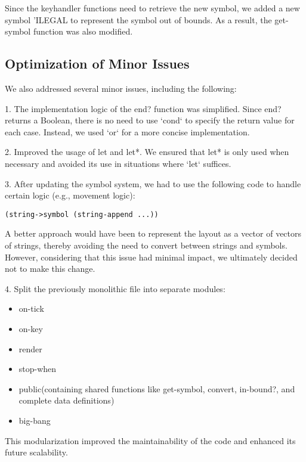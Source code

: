 \documentclass[12pt]{article}
\begin{document}
\indent Since the keyhandler functions need to retrieve the new symbol, we added a new symbol 'ILEGAL to represent the symbol out of bounds. As a result, the get-symbol function was also modified.

\subsection*{Optimization of Minor Issues}
\hspace*{1.27cm}We also addressed several minor issues, including the following:  

1. The implementation logic of the end? function was simplified. Since end? returns a Boolean, there is no need to use `cond` to specify the return value for each case. Instead, we used `or` for a more concise implementation.

2. Improved the usage of let and let*. We ensured that let* is only used when necessary and avoided its use in situations where `let` suffices.

3. After updating the symbol system, we had to use the following code to handle certain logic (e.g., movement logic):  
\begin{lstlisting}
(string->symbol (string-append ...))
\end{lstlisting}

\indent A better approach would have been to represent the layout as a vector of vectors of strings, thereby avoiding the need to convert between strings and symbols. However, considering that this issue had minimal impact, we ultimately decided not to make this change.

4. Split the previously monolithic file into separate modules:
\begin{itemize}
  \item on-tick
  \item on-key
  \item render
  \item stop-when
  \item public(containing shared functions like get-symbol, convert, in-bound?, and complete data definitions)
  \item big-bang
\end{itemize}

\indent This modularization improved the maintainability of the code and enhanced its future scalability.
\end{document}
